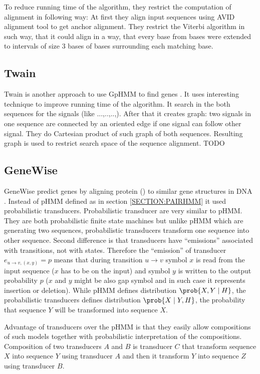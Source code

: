 To reduce running time of the algorithm, they restrict the computation of
alignment in following way: At first they  align input sequences using AVID
alignment tool\cite{Bray2003} to get anchor alignment. They restrict the Viterbi
algorithm in such way, that it could align  in a way, that every base from
bases were extended to intervals of size $3$ bases of bases surrounding each
matching base.



\subsection{Twain}

Twain is another approach to use GpHMM to find genes \cite{Majoros2005}. 
It uses interesting technique to improve
running time of the algorithm. It search in the both sequences for the signals
(like ...,..,..,). After that it creates graph: two signals in one sequence are
connected by an oriented edge if one signal can follow other signal. They do
Cartesian product of such graph of both sequences. Resulting graph is used to
restrict search space of the sequence alignment.
TODO


\subsection{GeneWise}

GeneWise predict genes by aligning protein () to similar gene structures in DNA
\cite{GeneWise2004}. Instead of pHMM defined as in section \ref{SECTION:PAIRHMM}
it used probabilistic transducers. Probabilistic transducer are very similar to
pHMM. They are both probabilistic finite state machines but unlike pHMM which
are generating two sequences, probabilistic transducers transform one sequence
into other sequence.  Second difference is that transducers have ``emissions''
associated with transitions, not with states.  Therefore the ``emission'' of
transducer $e_{u\to v,(x,y)}=p$ means that during transition $u\to v$ symbol $x$
is read from the input sequence ($x$ has to be on the input) and symbol $y$ is
written to the output probability $p$ ($x$ and $y$ might be also gap symbol and
in such case it represents insertion or deletion).  While pHMM defines
distribution $\prob{X,Y\mid H}$, the probabilistic transducers defines
distribution $\prob{X\mid Y,H}$, the probability that sequence $Y$ will be
transformed into sequence $X$.

Advantage of transducers over the pHMM is that they easily allow compositions of
such models together with probabilistic interpretation of the compositions.
Composition of two transducers $A$ and $B$ is transducer $C$ that transform
sequence $X$ into sequence $Y$ using transducer $A$ and then it transform $Y$
into sequence $Z$ using transducer $B$. %

